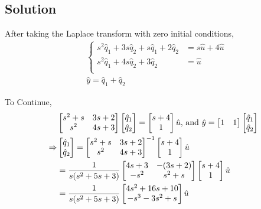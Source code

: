 \documentclass[12pt,a4paper]{article}
\begin{document}
\subsection*{Solution}

After taking the Laplace transform with zero initial conditions,
\begin{align*}
	&\begin{cases}
		s^2 \hat q_1 + 3 s \hat q_2 + s\hat q_1 + 2\hat q_2 &= s \hat u + 4\hat u \\
		s^2 \hat q_1 + 4 s \hat q_2 + 3 \hat q_2 &= \hat u \\
	\end{cases} \\
	&\hat y = \hat q_1 + \hat q_2
\end{align*}

To Continue, 
\begin{align*}
	&\begin{bmatrix}
		s^2 + s & 3s + 2 \\
		s^2 & 4s+3
	\end{bmatrix} \begin{bmatrix}
	\hat q_1 \\ \hat q_2
	\end{bmatrix} = \begin{bmatrix}
	s + 4 \\ 1
	\end{bmatrix} \hat u \text{, and } \hat y = \begin{bmatrix}
	1 & 1
	\end{bmatrix} \begin{bmatrix}
	\hat q_1 \\ \hat q_2
	\end{bmatrix} \\
	\Rightarrow & \begin{bmatrix}
			\hat q_1 \\ \hat q_2
	\end{bmatrix} = \begin{bmatrix}
		s^2 + s & 3s + 2 \\
s^2 & 4s+3
	\end{bmatrix}^{-1}\begin{bmatrix}
	s + 4 \\ 1
	\end{bmatrix} \hat u \\
	&= {1\over s(s^2+5s+3)}
	\begin{bmatrix}
		4s+3 & -(3s+2) \\
		-s^2 & s^2+s
	\end{bmatrix}
	\begin{bmatrix}s+4\\1\end{bmatrix}\hat u \\
	&= {1\over s(s^2+5s+3)}
	\begin{bmatrix}
		4s^2+16s+10 \\
		-s^3-3s^2+s
	\end{bmatrix}\hat u
\end{align*} 
\end{document}
